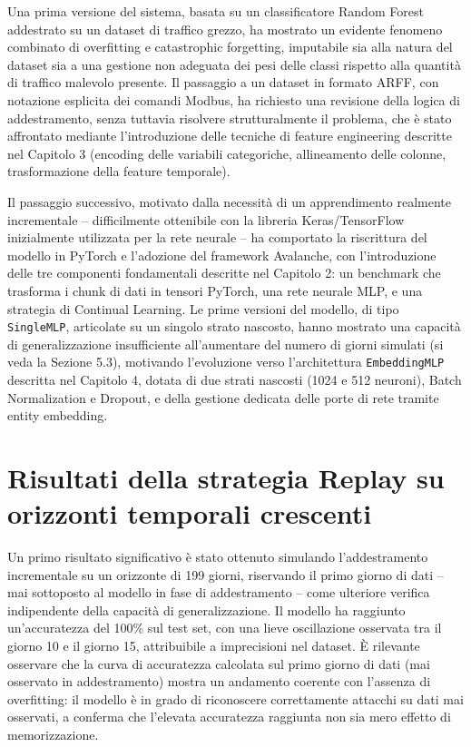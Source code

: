 \documentclass[12pt,a4paper]{report}
\begin{document}
Una prima versione del sistema, basata su un classificatore Random Forest addestrato su un dataset di traffico grezzo, ha mostrato un evidente fenomeno combinato di overfitting e catastrophic forgetting, imputabile sia alla natura del dataset sia a una gestione non adeguata dei pesi delle classi rispetto alla quantità di traffico malevolo presente. Il passaggio a un dataset in formato ARFF, con notazione esplicita dei comandi Modbus, ha richiesto una revisione della logica di addestramento, senza tuttavia risolvere strutturalmente il problema, che è stato affrontato mediante l'introduzione delle tecniche di feature engineering descritte nel Capitolo 3 (encoding delle variabili categoriche, allineamento delle colonne, trasformazione della feature temporale).

Il passaggio successivo, motivato dalla necessità di un apprendimento realmente incrementale -- difficilmente ottenibile con la libreria Keras/TensorFlow inizialmente utilizzata per la rete neurale -- ha comportato la riscrittura del modello in PyTorch e l'adozione del framework Avalanche, con l'introduzione delle tre componenti fondamentali descritte nel Capitolo 2: un benchmark che trasforma i chunk di dati in tensori PyTorch, una rete neurale MLP, e una strategia di Continual Learning. Le prime versioni del modello, di tipo \texttt{SingleMLP}, articolate su un singolo strato nascosto, hanno mostrato una capacità di generalizzazione insufficiente all'aumentare del numero di giorni simulati (si veda la Sezione 5.3), motivando l'evoluzione verso l'architettura \texttt{EmbeddingMLP} descritta nel Capitolo 4, dotata di due strati nascosti (1024 e 512 neuroni), Batch Normalization e Dropout, e della gestione dedicata delle porte di rete tramite entity embedding.

\section{Risultati della strategia Replay su orizzonti temporali crescenti}

Un primo risultato significativo è stato ottenuto simulando l'addestramento incrementale su un orizzonte di 199 giorni, riservando il primo giorno di dati -- mai sottoposto al modello in fase di addestramento -- come ulteriore verifica indipendente della capacità di generalizzazione. Il modello ha raggiunto un'accuratezza del 100\% sul test set, con una lieve oscillazione osservata tra il giorno 10 e il giorno 15, attribuibile a imprecisioni nel dataset. È rilevante osservare che la curva di accuratezza calcolata sul primo giorno di dati (mai osservato in addestramento) mostra un andamento coerente con l'assenza di overfitting: il modello è in grado di riconoscere correttamente attacchi su dati mai osservati, a conferma che l'elevata accuratezza raggiunta non sia mero effetto di memorizzazione.
\end{document}

